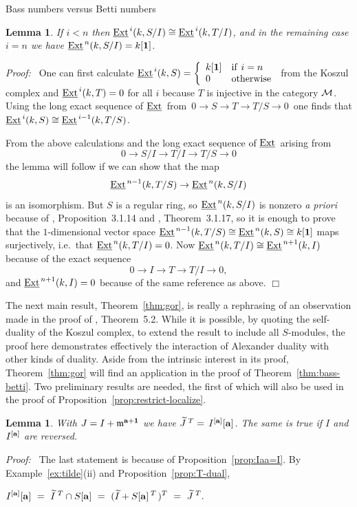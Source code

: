 \documentclass[12pt,leqno]{article}
\newtheorem{lemma}[thm]{Lemma}
\def\eext{{{\underline{\rm Ext}}{\scriptscriptstyle \,}}}
\def\aa{{{\rm \bf a}}}
\def\mm{{\mathfrak m}}
\begin{document}
\begin{section}{Bass numbers versus Betti numbers}
\begin{lemma} \label{lemma:mu_n}
If $i < n$ then $\eext^i(k,S/I) \cong \eext^i(k,T/I)$, and in the
remaining case $i = n$ we have $\eext^n(k,S/I) = k[{\bf 1}]$.
\end{lemma}
{\it Proof:\ } One can first calculate 
$
\eext^i(k,S) = 
	\left\{\begin{array}{ll}
		k[{\bf 1}] & {\rm if}\ i = n \cr
		0	   & {\rm otherwise}
	\end{array}\right.
$
from the Koszul complex and $\eext^i(k,T) = 0$ for all $i$ because $T$ is
injective in the category $\cal M$.  Using the long exact sequence of
$\eext$ from $\,0 \to S \to T \to T/S \to 0\,$ one finds that
$\eext^i(k,S) \cong \eext^{i-1}(k,T/S)$.

{}From the above calculations and the long exact sequence of $\eext$
arising from
$$
	0 \to S/I \to T/I \to T/S \to 0
$$
the lemma will follow if we can show that the map
$$
	\eext^{n-1}(k,T/S) \to \eext^n(k,S/I)
$$
is an isomorphism.  But $S$ is a regular ring, so $\eext^n(k,S/I)$ is
nonzero {\it a priori} because of \cite{BH}, Proposition~3.1.14 and
\cite{BH}, Theorem~3.1.17, so it is enough to prove that the
$1$-dimensional vector space $\eext^{n-1}(k,T/S) \cong \eext^n(k,S) \cong
k[{\bf 1}]$ maps surjectively, i.e.\ that $\eext^n(k,T/I) = 0$.  Now
$\eext^n(k,T/I) \cong \eext^{n+1}(k,I)$ because of the exact sequence
$$
	0 \to I \to T \to T/I \to 0,
$$
and $\eext^{n+1}(k,I) = 0$ because of the same \cite{BH} reference as
above.
%
\hfill
$\Box$
\vskip 2mm

The next main result, Theorem~\ref{thm:gor}, is really a rephrasing of an
observation made in the proof of \cite{Hoc}, Theorem~5.2.  While it is
possible, by quoting the self-duality of the Koszul complex, to extend
the result to include all $S$-modules, the proof here demonstrates
effectively the interaction of Alexander duality with other kinds of
duality.  Aside from the intrinsic interest in its proof,
Theorem~\ref{thm:gor} will find an application in the proof of
Theorem~\ref{thm:bass-betti}.  Two preliminary results are needed, the
first of which will also be used in the proof of
Proposition~\ref{prop:restrict-localize}.
\begin{lemma} \label{lemma:Jtilde}
With $J = I + \mm^{\aa + {\bf 1}}$ we have $\widetilde{J}^{\;T} =\,
I^{[\aa]}[\aa]$.  The same is true if $I$ and $I^{[\aa]}$ are reversed.
\end{lemma}
{\it Proof:\ } The last statement is because of
Proposition~\ref{prop:Iaa=I}.  By Example~\ref{ex:tilde}(ii) and
Proposition~\ref{prop:T-dual},
\vskip 1mm
\noindent
\parbox{.95\linewidth}{\centering
$ \displaystyle
  I^{[\aa]}[\aa]\ =\ \widetilde{I}^{\;T} \cap S[\aa]\ =\ (\widetilde{I} +
  S[\aa]^{\:T\,})^T\ =\ \widetilde{J}^{\;T}.
$
}
{
\settodepth{\Mylen}{
\parbox{.95\linewidth}{\centering
$ \displaystyle
  I^{[\aa]}[\aa]\ =\ \widetilde{I}^{\;T} \cap S[\aa]\ =\ (\widetilde{I} +
  S[\aa]^{\:T\,})^T\ =\ \widetilde{J}^{\;T}.
$
}}
\addtolength{\Mylen}{-1.3mm}
\hfill \raisebox{-\Mylen}{$\Box$}
\vskip 1mm
}


\end{section}
\end{document}
